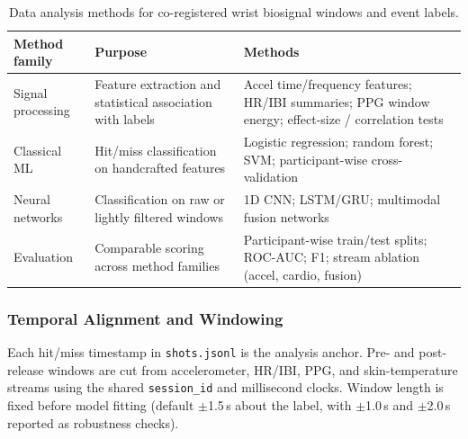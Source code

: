 \documentclass[sensors,article,submit,pdftex,moreauthors]{Definitions/mdpi}
\begin{document}
\begin{table}[H]

\caption{Data analysis methods for co-registered wrist biosignal windows and event labels.\label{tab:analysisplan}}

\small

\begin{tabular}{@{}p{2.4cm}p{5.2cm}p{5.2cm}@{}}

\toprule

\textbf{Method family} & \textbf{Purpose} & \textbf{Methods} \\

\midrule

Signal processing & Feature extraction and statistical association with labels & Accel time/frequency features; HR/IBI summaries; PPG window energy; effect-size / correlation tests \\

Classical ML & Hit/miss classification on handcrafted features & Logistic regression; random forest; SVM; participant-wise cross-validation \\

Neural networks & Classification on raw or lightly filtered windows & 1D CNN; LSTM/GRU; multimodal fusion networks \\

Evaluation & Comparable scoring across method families & Participant-wise train/test splits; ROC-AUC; F1; stream ablation (accel, cardio, fusion) \\

\bottomrule

\end{tabular}

\end{table}



\subsubsection{Temporal Alignment and Windowing}



Each hit/miss timestamp in \texttt{shots.jsonl} is the analysis anchor. Pre- and post-release windows are cut from accelerometer, HR/IBI, PPG, and skin-temperature streams using the shared \texttt{session\_id} and millisecond clocks. Window length is fixed before model fitting (default $\pm$1.5\,s about the label, with $\pm$1.0\,s and $\pm$2.0\,s reported as robustness checks).
\end{document}
